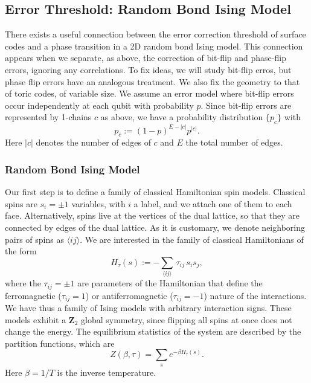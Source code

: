 \documentclass{article}
\newcommand{\Z}{\mathbf{Z}}
\newcommand{\sset}[1]{ \{#1\} }
\newcommand{\pij}{{\langle i j\rangle}}
\begin{document}
\subsection{Error Threshold: Random Bond Ising Model}\label{sec:threshold}

There exists a useful connection between the error correction threshold of surface codes and a phase transition in a 2D random bond Ising model. This connection appears when we separate, as above, the correction of bit-flip and phase-flip errors, ignoring any correlations. To fix ideas, we will study bit-flip erros, but phase flip errors have an analogous treatment. We also fix the geometry to that of toric codes, of variable size. We assume an error model where bit-flip errors occur independently at each qubit with probability $p$. Since bit-flip errors are represented by 1-chains $c$ as above, we have a probability distribution $\sset {p_c}$ with
\begin{equation}\label{pc}
p_c:=(1-p)^{E-|c|}p^{|c|}.
\end{equation}
Here $|c|$ denotes the number of edges of $c$ and $E$ the total number of edges. %

\subsubsection{Random Bond Ising Model}

Our first step is to define a family of classical Hamiltonian spin models. Classical spins are $s_i=\pm 1$ variables, with $i$ a label, and we attach one of them to each face. Alternatively, spins live at the vertices of the dual lattice, so that they are connected by edges of the dual lattice. As it is customary, we denote neighboring pairs of spins as $\pij$. We are interested in the family of classical Hamiltonians of the form
\begin{equation}\label{Hamiltonian_p}
H_\tau(s):= - \sum_{\langle ij \rangle}\, \tau_{ij} \,s_is_j,
\end{equation}
where the $\tau_{ij}=\pm 1$ are parameters of the Hamiltonian that define the ferromagnetic ($\tau_{ij}=1$) or antiferromagnetic ($\tau_{ij}=-1$) nature of the interactions. We have thus a family of Ising models with arbitrary interaction signs. These models exhibit a $\Z_2$ global symmetry, since flipping all spins at once does not change the energy. The equilibrium statistics of the system are described by the partition functions, which are
\begin{equation}\label{partition}
Z(\beta,\tau) = \sum_{s} e^{-\beta H_{\tau}(s)}.
\end{equation}
Here $\beta=1/T$ is the inverse temperature.
\end{document}
